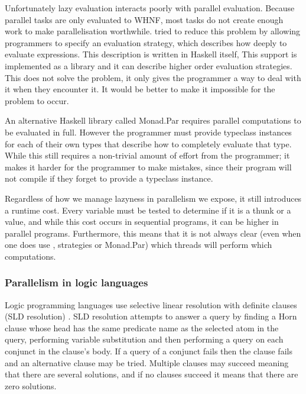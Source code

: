 Unfortunately lazy evaluation interacts poorly with
parallel evaluation.
Because parallel tasks are only evaluated to WHNF,
most tasks do not create enough work to make parallelisation worthwhile.
\citet{trinder:98:strategies}
tried to reduce this problem by allowing programmers to
specify an evaluation strategy,
which describes how deeply to evaluate expressions.
This description is written in Haskell itself,
This support is implemented as a library and it can describe higher order
evaluation strategies.
This does not solve the problem,
it only gives the programmer a way to deal with it when they encounter it.
It would be better to make it impossible for the problem to occur.

An alternative Haskell library called Monad.Par \citep{marlow:monadpar}
requires parallel computations to be evaluated in full.
However the programmer must provide typeclass instances for each of their
own types that describe how to completely evaluate that type.
While this still requires a non-trivial amount of effort from the
programmer;
it makes it harder for the programmer to make mistakes,
since their program will not compile if they forget to provide a typeclass
instance.

Regardless of how we manage lazyness in parallelism we expose,
it still introduces a runtime cost.
Every variable must be tested to determine if it is a thunk or a value,
and while this cost occurs in sequential programs, it can be higher in
parallel programs.
Furthermore, this means that it is not always clear
(even when one does use , strategies or Monad.Par)
which threads will perform which computations.

\subsubsection{Parallelism in logic languages}
\label{sec:intro_par_logic}

Logic programming languages use selective linear resolution with definite
clauses (SLD resolution) \citep{kowalski_sld}.
SLD resolution attempts to answer a query by finding a Horn clause whose
head has the same predicate name as the selected atom in the query,
performing variable substitution and then performing a query on each
conjunct in the clause's body.
If a query of a conjunct fails then the clause fails and an alternative
clause may be tried.
Multiple clauses may succeed meaning that there are several solutions,
and if no clauses succeed it means that there are zero solutions.

